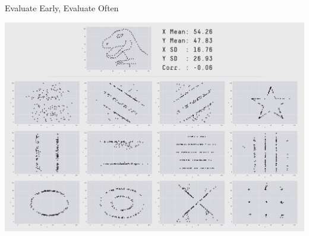\begin{frame}[c]{Evaluate Early, Evaluate Often}
    \begin{center}
        \includegraphics[width=.6\textwidth]{images/datasaurus}
    \end{center}
\end{frame}


